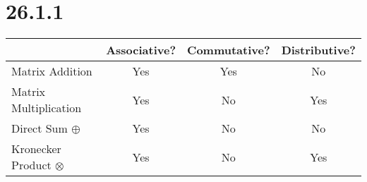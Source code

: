 \section*{26.1.1}

\begin{center}
\begin{tabular}{|l|c|c|c|}
\hline
& Associative? & Commutative? & Distributive?\\
\hline
Matrix Addition & Yes & Yes & No\\
\hline
Matrix Multiplication & Yes & No & Yes\\
\hline
Direct Sum $\oplus$ & Yes & No & No\\
\hline
Kronecker Product $\otimes$ & Yes & No & Yes\\
\hline
\end{tabular}
\end{center}

